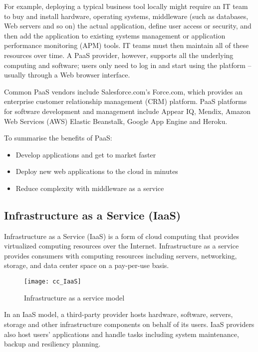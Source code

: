 For example, deploying a typical business tool locally might require an IT team to buy and install hardware, operating systems, middleware (such as databases, Web servers and so on) the actual application, define user access or security, and then add the application to existing systems management or application performance monitoring (APM) tools. IT teams must then maintain all of these resources over time. A PaaS provider, however, supports all the underlying computing and software; users only need to log in and start using the platform – usually through a Web browser interface.

Common PaaS vendors include Salesforce.com's Force.com, which provides an enterprise customer relationship management (CRM) platform. PaaS platforms for software development and management include Appear IQ, Mendix, Amazon Web Services (AWS) Elastic Beanstalk, Google App Engine and Heroku.

To summarise the benefits of PaaS:
\begin{itemize}
	\item Develop applications and get to market faster
	\item Deploy new web applications to the cloud in minutes
	\item Reduce complexity with middleware as a service
\end{itemize}

\subsection{Infrastructure as a Service (IaaS)}\label{ssec:IaaS}

Infrastructure as a Service (IaaS) is a form of cloud computing that provides virtualized computing resources over the Internet. Infrastructure as a service provides consumers with computing resources including servers, networking, storage, and data center space on a pay-per-use basis.

\begin{figure}[H]
	\begin{center}
		\texttt{[image: cc\_IaaS]}
		\caption{Infrastructure as a service model\cite{IBMcloud:IaaS}}
		\label{fig:cc_IaaS}
	\end{center}
	\vspace{-10pt}
\end{figure}

In an IaaS model, a third-party provider hosts hardware, software, servers, storage and other infrastructure components on behalf of its users. IaaS providers also host users' applications and handle tasks including system maintenance, backup and resiliency planning.

